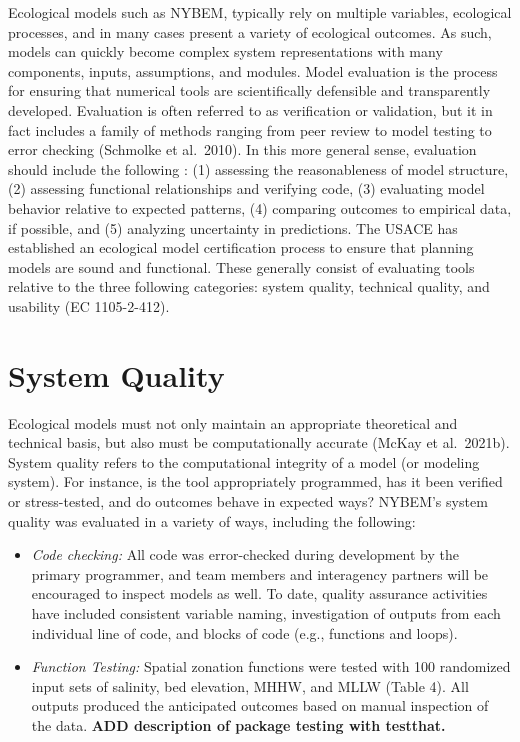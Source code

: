 \documentclass[
]{book}
\begin{document}
Ecological models such as NYBEM, typically rely on multiple variables, ecological processes, and in many cases present a variety of ecological outcomes. As such, models can quickly become complex system representations with many components, inputs, assumptions, and modules. Model evaluation is the process for ensuring that numerical tools are scientifically defensible and transparently developed. Evaluation is often referred to as verification or validation, but it in fact includes a family of methods ranging from peer review to model testing to error checking (Schmolke et al.~2010). In this more general sense, evaluation should include the following \citep{grant_ecological_2008}: (1) assessing the reasonableness of model structure, (2) assessing functional relationships and verifying code, (3) evaluating model behavior relative to expected patterns, (4) comparing outcomes to empirical data, if possible, and (5) analyzing uncertainty in predictions. The USACE has established an ecological model certification process to ensure that planning models are sound and functional. These generally consist of evaluating tools relative to the three following categories: system quality, technical quality, and usability (EC 1105-2-412).

\hypertarget{system-quality}{%
\section{System Quality}\label{system-quality}}

Ecological models must not only maintain an appropriate theoretical and technical basis, but also must be computationally accurate (McKay et al.~2021b). System quality refers to the computational integrity of a model (or modeling system). For instance, is the tool appropriately programmed, has it been verified or stress-tested, and do outcomes behave in expected ways? NYBEM's system quality was evaluated in a variety of ways, including the following:

\begin{itemize}
\item
  \emph{Code checking:} All code was error-checked during development by the primary programmer, and team members and interagency partners will be encouraged to inspect models as well. To date, quality assurance activities have included consistent variable naming, investigation of outputs from each individual line of code, and blocks of code (e.g., functions and loops).
\item
  \emph{Function Testing:} Spatial zonation functions were tested with 100 randomized input sets of salinity, bed elevation, MHHW, and MLLW (Table 4). All outputs produced the anticipated outcomes based on manual inspection of the data. \textbf{ADD description of package testing with testthat.}
\end{itemize}
\end{document}
